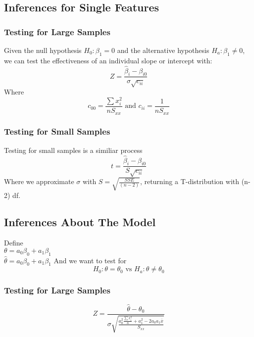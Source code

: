 \documentclass[sn-mathphys,Numbered]{sn-jnl}%
\begin{document}
\subsection{Inferences for Single Features}\label{linear-hypothesis}
\subsubsection{Testing for Large Samples}
Given the null hypothesis $H_0: \beta_1 = 0$ and the alternative hypothesis
$H_a: \beta_1 \neq 0$, we can test the effectiveness of an individual slope or
intercept with:\\
\begin{equation}
    Z = \frac{\hat \beta_i - \beta_{i0}}{\sigma \sqrt{c_{ii}}}
\end{equation}
Where
\begin{equation}
    c_{00} = \frac{\sum x_i^2}{nS_{xx}} \text{ and } c_{ii} = \frac{1}{nS_{xx}}
\end{equation}
\subsubsection{Testing for Small Samples}
Testing for small samples is a similiar process
\begin{equation}
    t = \frac{\hat \beta_i - \beta_{i0}}{S\sqrt{c_{ii}}}
\end{equation}
Where we approximate $\sigma$ with $S = \sqrt{\frac{SSE}{(n-2)}}$, returning a T-distribution with (n-2) df.
\subsection{Inferences About The Model}\label{linear-model-hypothesis}
Define \\ $\theta = a_0\beta_0 + a_1\beta_1$ \\ $\hat \theta = a_0\beta_0 +
    a_1\beta_1$ And we want to test for
\begin{equation}
    H_0: \theta = \theta_0 \text{ vs } H_a: \theta \neq \theta_0
    \nonumber
\end{equation}
\subsubsection{Testing for Large Samples}
\begin{equation}
    Z = \frac{\hat \theta - \theta_0}
    {\sigma \sqrt{\frac{a_0^2{\frac{\sum x_i^2}{n}} + a_1^2 - 2a_0a_1 \bar x}{S_{xx}}}}
\end{equation}
\end{document}
